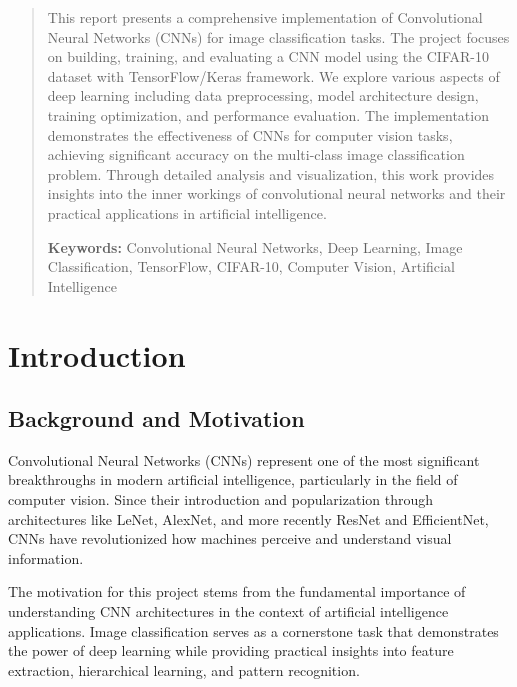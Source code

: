 \documentclass[11pt,a4paper]{article}
\begin{document}
\maketitle
\newpage

\tableofcontents
\newpage

\begin{abstract}
This report presents a comprehensive implementation of Convolutional Neural Networks (CNNs) for image classification tasks. The project focuses on building, training, and evaluating a CNN model using the CIFAR-10 dataset with TensorFlow/Keras framework. We explore various aspects of deep learning including data preprocessing, model architecture design, training optimization, and performance evaluation. The implementation demonstrates the effectiveness of CNNs for computer vision tasks, achieving significant accuracy on the multi-class image classification problem. Through detailed analysis and visualization, this work provides insights into the inner workings of convolutional neural networks and their practical applications in artificial intelligence.

\textbf{Keywords:} Convolutional Neural Networks, Deep Learning, Image Classification, TensorFlow, CIFAR-10, Computer Vision, Artificial Intelligence
\end{abstract}

\section{Introduction}

\subsection{Background and Motivation}

Convolutional Neural Networks (CNNs) represent one of the most significant breakthroughs in modern artificial intelligence, particularly in the field of computer vision. Since their introduction and popularization through architectures like LeNet, AlexNet, and more recently ResNet and EfficientNet, CNNs have revolutionized how machines perceive and understand visual information.

The motivation for this project stems from the fundamental importance of understanding CNN architectures in the context of artificial intelligence applications. Image classification serves as a cornerstone task that demonstrates the power of deep learning while providing practical insights into feature extraction, hierarchical learning, and pattern recognition.
\end{document}
